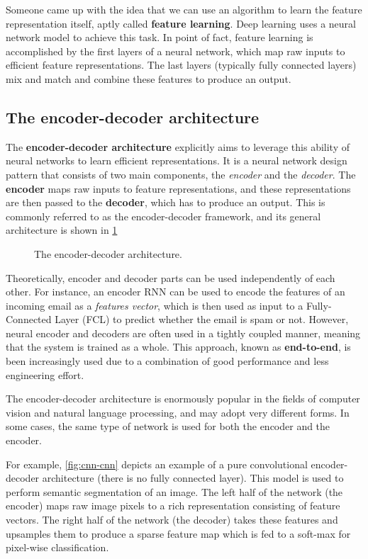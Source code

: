 Someone came up with the idea that we can use an algorithm to learn the feature representation itself, aptly called \textbf{feature learning}. Deep learning uses a neural network model to achieve this task. In point of fact, feature learning is accomplished by the first layers of a neural network, which map raw inputs to efficient feature representations. The last layers (typically fully connected layers) mix and match and combine these features to produce an output.

\subsection{The encoder-decoder architecture}

The \textbf{encoder-decoder architecture} explicitly aims to leverage this ability of neural networks to learn efficient representations. It is a neural network design pattern that consists of two main components, the \textit{encoder} and the \textit{decoder}.  The \textbf{encoder} maps raw inputs to feature representations, and these representations are then passed to the \textbf{decoder}, which has to produce an output. This is commonly referred to as the encoder-decoder framework, and its general architecture is shown in \cref{fig:encoder-decoder}

\begin{figure}[hpt]
	\centering
	
	\caption{The encoder-decoder architecture.}
	\label{fig:encoder-decoder}
\end{figure}

Theoretically, encoder and decoder parts can be used independently of each other. For instance, an encoder RNN can be used to encode the features of an incoming email as a \textit{features vector}, which is then used as input to a Fully-Connected Layer (FCL) to predict whether the email is spam or not. However, neural encoder and decoders are often used in a tightly coupled manner, meaning that the system is trained as a whole. This approach, known as \textbf{end-to-end}, is been increasingly used due to a combination of good performance and less engineering effort.

The encoder-decoder architecture is enormously popular in the fields of computer vision and natural language processing, and may adopt very different forms. In some cases, the same type of network is used for both the encoder and the encoder.

For example, \cref{fig:cnn-cnn} depicts an example of a pure convolutional encoder-decoder architecture (there is no fully connected layer). This model is used to perform semantic segmentation of an image. The left half of the network (the encoder) maps raw image pixels to a rich representation consisting of feature vectors. The right half of the network (the decoder) takes these features and upsamples them to produce a sparse feature map which is fed to a soft-max for pixel-wise classification.

